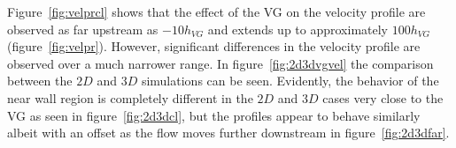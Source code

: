 Figure~\ref{fig:velprcl} shows that the effect of the VG on the velocity profile are observed as far upstream as $-10 h_{VG}$ and extends up to approximately $100 h_{VG}$ (figure~\ref{fig:velpr}). However, significant differences in the velocity profile are observed over a much narrower range. In figure~\ref{fig:2d3dvgvel} the comparison between the $2D$ and $3D$ simulations can be seen. Evidently, the behavior of the near wall region is completely different in the $2D$ and $3D$ cases very close to the VG as seen in figure~\ref{fig:2d3dcl}, but the profiles appear to behave similarly albeit with an offset as the flow moves further downstream in figure~\ref{fig:2d3dfar}.
